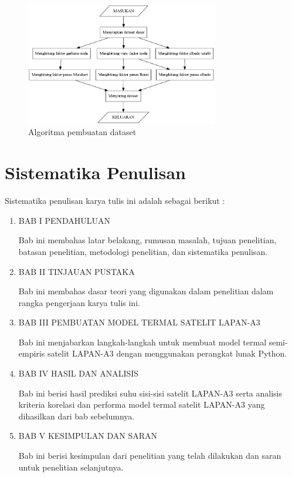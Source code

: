 \begin{figure}[H]
\setlength{}
\begin{center}
\includegraphics[width=0.75\textwidth]{fig/graph_algoritma.png}
\caption{Algoritma pembuatan dataset}
\label{fig:algoritma}
\end{center}
\end{figure}

\section{Sistematika Penulisan}

Sistematika penulisan karya tulis ini adalah sebagai berikut :

\begin{enumerate}
\item BAB I PENDAHULUAN

Bab ini membahas latar belakang, rumusan masalah, tujuan penelitian, batasan
penelitian, metodologi penelitian, dan sistematika penulisan.

\item BAB II TINJAUAN PUSTAKA

Bab ini membahas dasar teori yang digunakan dalam penelitian dalam rangka
pengerjaan karya tulis ini.

\item BAB III PEMBUATAN MODEL TERMAL SATELIT LAPAN-A3

Bab ini menjabarkan langkah-langkah untuk membuat model termal semi-empiris
satelit LAPAN-A3 dengan menggunakan perangkat lunak Python.

\item BAB IV HASIL DAN ANALISIS

Bab ini berisi hasil prediksi suhu sisi-sisi satelit LAPAN-A3 serta analisis
kriteria korelasi dan performa model termal satelit LAPAN-A3 yang dihasilkan
dari bab sebelumnya.

\item BAB V KESIMPULAN DAN SARAN

Bab ini berisi kesimpulan dari penelitian yang telah dilakukan dan saran
untuk penelitian selanjutnya.
\end{enumerate}
